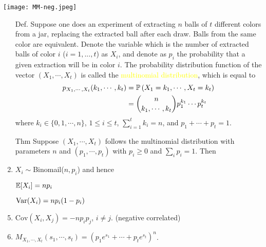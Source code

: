 \begin{frame}
	\texttt{[image: MM-neg.jpeg]}
\begin{enumerate}
\item[Def.] Suppose one does an experiment of extracting $n$ balls of $t$ different colors from a jar,
	replacing the extracted ball after each draw.
	Balls from the same color are equivalent.
	Denote the variable which is the number of extracted balls of color $i$ ($i = 1, ..., t$) as $X_i$,
	and denote as $p_i$ the probability that a given extraction will be in color $i$.
	The probability distribution function of the vector $(X_1,\cdots,X_t)$ is called
	the \textcolor{yellow}{multinomial distribution}, which is equal to
	\begin{align*}
		p_{X_1,\cdots,X_t}(k_1,\cdots,k_t)
		&= \mathbb{P}\left( X_1=k_1,\cdots,X_t=k_t \right)\\
		&= {n\choose k_1,\cdots,k_t} p_1^{k_1}\cdots p_t^{k_t}
	\end{align*}
	where $k_i\in\{0,1,\cdots, n\}$, $1\le i\le t$, $\sum_{i=1}^t k_i=n$, and $p_1+\cdots+p_t=1$.
\end{enumerate}
\end{frame}
\begin{frame}
	\begin{enumerate}
		\item[Thm] Suppose $(X_1,\cdots, X_t)$ follows the multinomial distribution with parameters $n$ and $(p_1,\cdots,p_t)$ with $p_i\ge 0$ and $\sum_{i}p_i=1$. Then\\[1em]
		\item $X_i\sim$Binomail($n,p_i$) and hence\\[2em]
		\item[] $\mathbb{E}[X_i] = n p_i$
		\item[] $\text{Var}(X_i) = n p_i(1-p_i)$
		\vfill
		\item $\text{Cov}(X_i,X_j) = -np_ip_j$, $i\ne j$. \hfill (negative correlated)
		\vfill
		\item $M_{X_1,\cdots,X_t}(s_1,\cdots,s_t) = \left(p_1e^{s_1} + \cdots + p_t e^{s_t} \right)^n$.
	\end{enumerate}
\end{frame}
